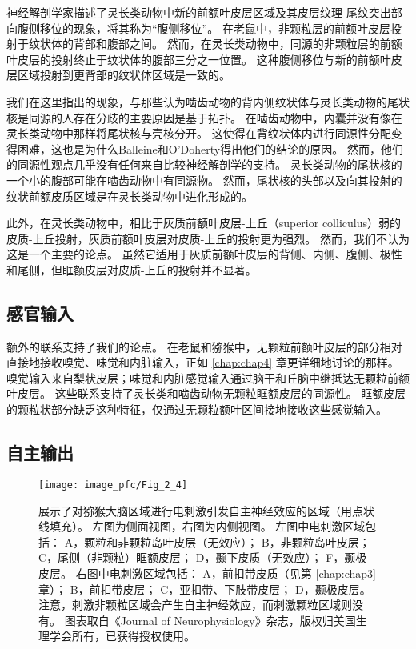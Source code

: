 神经解剖学家描述了灵长类动物中新的前额叶皮层区域及其皮层纹理-尾纹突出部向腹侧移位的现象，将其称为“腹侧移位”\cite{schilman2008orbital}。
在老鼠中，非颗粒层的前额叶皮层投射于纹状体的背部和腹部之间。
然而，在灵长类动物中，同源的非颗粒层的前额叶皮层的投射终止于纹状体的腹部三分之一位置。
这种腹侧移位与新的前额叶皮层区域投射到更背部的纹状体区域是一致的。


我们在这里指出的现象，与那些认为啮齿动物的背内侧纹状体与灵长类动物的尾状核是同源的人存在分歧的主要原因是基于拓扑\cite{balleine2010human}。
在啮齿动物中，内囊并没有像在灵长类动物中那样将尾状核与壳核分开。
这使得在背纹状体内进行同源性分配变得困难，这也是为什么Balleine和O'Doherty得出他们的结论的原因。
然而，他们的同源性观点几乎没有任何来自比较神经解剖学的支持。
灵长类动物的尾状核的一个小的腹部可能在啮齿动物中有同源物。
然而，尾状核的头部以及向其投射的纹状前额皮质区域是在灵长类动物中进化形成的。


此外，在灵长类动物中，相比于灰质前额叶皮层-上丘（superior colliculus）弱的皮质-上丘投射，灰质前额叶皮层对皮质-上丘的投射更为强烈\cite{preuss1995rats}。
然而，我们不认为这是一个主要的论点。
虽然它适用于灰质前额叶皮层的背侧、内侧、腹侧、极性和尾侧，但眶额皮层对皮质-上丘的投射并不显著\cite{leichnetz1981prefrontal}。


\subsection{感官输入}
额外的联系支持了我们的论点。
在老鼠和猕猴中，无颗粒前额叶皮层的部分相对直接地接收嗅觉、味觉和内脏输入\cite{ray1993organization}，正如 \ref{chap:chap4} 章更详细地讨论的那样。
嗅觉输入来自梨状皮层；味觉和内脏感觉输入通过脑干和丘脑中继抵达无颗粒前额叶皮层。
这些联系支持了灵长类和啮齿动物无颗粒眶额皮层的同源性。
眶额皮层的颗粒状部分缺乏这种特征，仅通过无颗粒额叶区间接地接收这些感觉输入。


\subsection{自主输出}

\begin{figure}[!htb]
	\centering
	\texttt{[image: image\_pfc/Fig\_2\_4]}
	\caption{展示了对猕猴大脑区域进行电刺激引发自主神经效应的区域（用点状线填充）。
		左图为侧面视图，右图为内侧视图。
		左图中电刺激区域包括：
		A，颗粒和非颗粒岛叶皮层（无效应）；
		B，非颗粒岛叶皮层；
		C，尾侧（非颗粒）眶额皮层；
		D，颞下皮质（无效应）；
		F，颞极皮层。
		右图中电刺激区域包括：
		A，前扣带皮质（见第 \ref{chap:chap3} 章）；
		B，前扣带皮层；
		C，亚扣带、下肢带皮层；
		D，颞极皮层。
		注意，刺激非颗粒区域会产生自主神经效应，而刺激颗粒区域则没有\cite{kaada1949respiratory}。
		图表取自《Journal of  Neurophysiology》杂志，版权归美国生理学会所有，已获得授权使用。\label{fig:fig_2_4}}
\end{figure}


